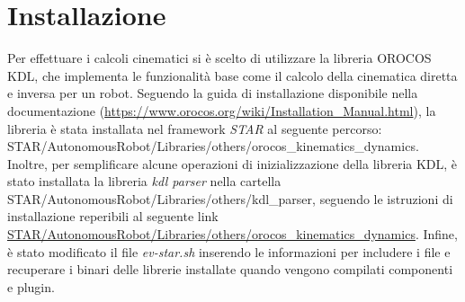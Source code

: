 \section{Installazione}
Per effettuare i calcoli cinematici si è scelto di utilizzare la libreria OROCOS KDL, che implementa le funzionalità base come il calcolo della cinematica diretta e inversa per un robot. Seguendo la guida di installazione disponibile nella documentazione (\url{https://www.orocos.org/wiki/Installation_Manual.html}), la libreria è stata installata nel framework \textit{STAR} al seguente percorso: STAR/AutonomousRobot/Libraries/others/orocos\_kinematics\_dynamics. Inoltre, per semplificare alcune operazioni di inizializzazione della libreria KDL, è stato installata la libreria \textit{kdl parser} nella cartella STAR/AutonomousRobot/Libraries/others/kdl\_parser, seguendo le istruzioni di installazione reperibili al seguente link \url{STAR/AutonomousRobot/Libraries/others/orocos\_kinematics\_dynamics}. Infine, è stato modificato il file \textit{ev-star.sh} inserendo le informazioni per includere i file e recuperare i binari delle librerie installate quando vengono compilati componenti e plugin.

